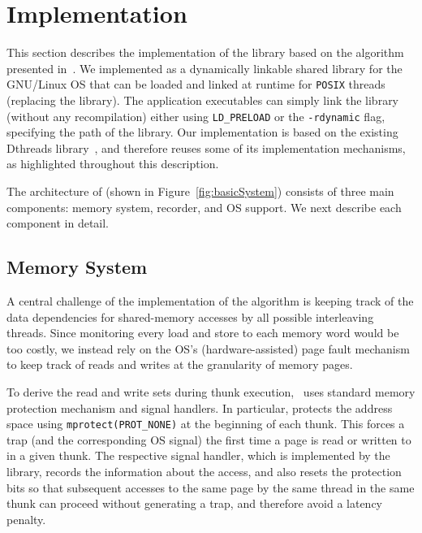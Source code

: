 \section{Implementation}
\label{sec:implementation}



This section describes the implementation of the \projecttitle library based on the algorithm presented in~. We implemented \projecttitle as a dynamically linkable shared library for the GNU/Linux OS that can be loaded and linked  at runtime for {\tt POSIX} threads (replacing the \pthreads library). The application executables can simply link the library (without any recompilation) either using {\tt LD\_PRELOAD} or the {\tt -rdynamic} flag, specifying the path of the \projecttitle library.   Our implementation is based on the existing Dthreads library~\cite{dthreads-sosp-2011}, and therefore reuses some of its implementation mechanisms, as highlighted throughout this description.


The architecture of \projecttitle (shown in Figure~\ref{fig:basicSystem}) consists of three main components: memory system, recorder, and OS support.  We next describe each component in detail.


\subsection{Memory System}


 A central challenge of the implementation of the algorithm is keeping track of the data dependencies for shared-memory accesses by all possible interleaving threads. Since monitoring every load and store to each memory word would be too costly, we instead rely on the OS's (hardware-assisted) page fault mechanism to keep track of reads and writes at the granularity of memory pages.

To derive the read and write sets during thunk execution,  \projecttitle~uses standard memory protection  mechanism and signal handlers. In particular, \projecttitle protects the address space using {\tt mprotect(PROT\_NONE)} at the beginning of each thunk. This forces a trap (and the corresponding OS signal) the first time a page is read or written to in a given thunk. The respective signal handler, which is implemented by the \projecttitle library, records the information about the access, and also resets the protection bits so that subsequent accesses to the same page by the same thread in the same thunk can proceed without generating a trap, and therefore avoid a
latency penalty.  


